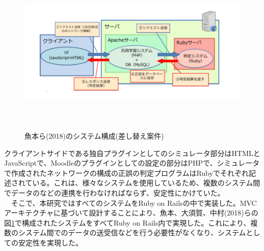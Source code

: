 \begin{figure}[htbp]
  \begin{center}
    \includegraphics[clip,width=12.0cm,height=8.0cm]{img/beforeCons.png}
    \caption{魚本ら(2018)のシステム構成(差し替え案件)}
    \label{fig:beforeCons}
  \end{center}
\end{figure}

クライアントサイドである独自プラグインとしてのシミュレータ部分はHTMLとJavaScriptで、Moodleのプラグインとしての設定の部分はPHPで、シミュレータで作成されたネットワークの構成の正誤の判定プログラムはRubyでそれぞれ記述されている。これは、様々なシステムを使用しているため、複数のシステム間でデータのなどの連携を行わなければならず、安定性にかけていた。\\
　そこで、本研究ではすべてのシステムをRuby on Railsの中で実装した。MVCアーキテクチャに基づいて設計することにより、魚本、大須賀、中村(2018)らの図\ref{fig:beforeCons}で構成されたシステムをすべてRuby on Rails内で実現した。これにより、複数のシステム間でのデータの送受信などを行う必要性がなくなり、システムとしての安定性を実現した。
